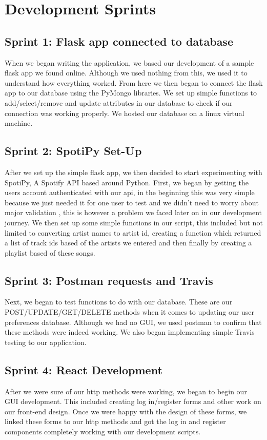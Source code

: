 \section{Development Sprints}
\subsection{Sprint 1: Flask app connected to database}
When we began writing the application, we based our development of a sample flask app we found online. Although we used nothing from this, we used it to understand how everything worked. From here we then began to connect the flask app to our database using the PyMongo libraries. We set up simple functions to add/select/remove and update attributes in our database to check if our connection was working properly. We hosted our database on a linux virtual machine.

\subsection{Sprint 2: SpotiPy Set-Up}
After we set up the simple flask app, we then decided to start experimenting with SpotiPy, A Spotify API based around Python. First, we began by getting the users account authenticated with our api, in the beginning this was very simple because we just needed it for one user to test and we didn’t need to worry about major validation , this is however a problem we faced later on in our development journey. We then set up some simple functions in our script, this included but not limited to converting artist names to artist id, creating a function which returned a list of track ids based of the artists we entered and then finally by creating a playlist based of these songs.

\subsection{Sprint 3: Postman requests and Travis}
Next, we began to test functions to do with our database. These are our POST/UPDATE/GET/DELETE methods when it comes to updating our user preferences database. Although we had no GUI, we used postman to confirm that these methods were indeed working. We also began implementing simple Travis testing to our application.

\subsection{Sprint 4: React Development}
After we were sure of our http methods were working, we began to begin our GUI development. This included creating log in/register forms and other work on our front-end design. Once we were happy with the design of these forms, we linked these forms to our http methods and got the log in and register components completely working with our development scripts.

